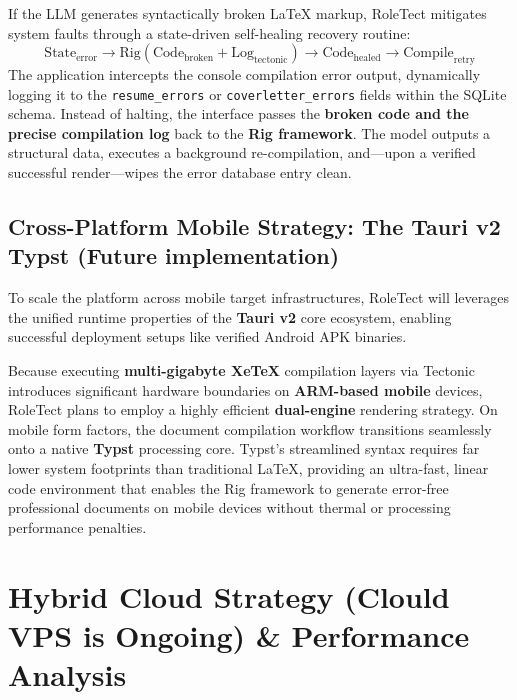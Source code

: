 \documentclass[10pt,a4paper]{article}
\begin{document}
If the LLM generates syntactically broken \LaTeX{} markup, RoleTect mitigates system faults through a state-driven self-healing recovery routine:
\begin{equation}
\text{State}_{\text{error}} \longrightarrow \text{Rig}(\text{Code}_{\text{broken}} + \text{Log}_{\text{tectonic}}) \longrightarrow \text{Code}_{\text{healed}} \longrightarrow \text{Compile}_{\text{retry}}
\end{equation}
The application intercepts the console compilation error output, dynamically logging it to the \texttt{resume\_errors} or \texttt{coverletter\_errors} fields within the SQLite schema. Instead of halting, the interface passes the \textbf{broken code and the precise compilation log} back to the \textbf{Rig framework}. The model outputs a structural data, executes a background re-compilation, and—upon a verified successful render—wipes the error database entry clean.

\subsection{Cross-Platform Mobile Strategy: The Tauri v2 Typst  (Future implementation)}
To scale the platform across mobile target infrastructures, RoleTect will leverages the unified runtime properties of the \textbf{Tauri v2} core ecosystem, enabling successful deployment setups like verified Android APK binaries.

Because executing \textbf{multi-gigabyte XeTeX} compilation layers via Tectonic introduces significant hardware boundaries on \textbf{ARM-based mobile} devices, RoleTect plans to employ a highly efficient \textbf{dual-engine} rendering strategy. On mobile form factors, the document compilation workflow transitions seamlessly onto a native \textbf{Typst} processing core. Typst's streamlined syntax requires far lower system footprints than traditional \LaTeX{}, providing an ultra-fast, linear code environment that enables the Rig framework to generate error-free professional documents on mobile devices without thermal or processing performance penalties.




\vspace{10mm}




\section{Hybrid Cloud Strategy (Clould VPS is Ongoing) \& Performance Analysis}
\end{document}
